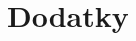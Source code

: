\documentclass[%
final%
,htext%
]{ipothes}
\begin{document}

%
%
%
%
%
%
%
%



%
%
%
%
  

\appendix
\part{Dodatky}\label{append}






%
%
%
%





{\small\sloppy

\par}


\end{document}
